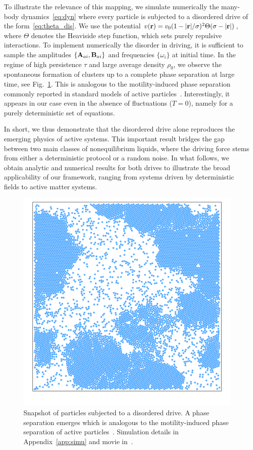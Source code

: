 \documentclass[superscriptaddress, twocolumn, prx, longbibliography, nofootinbib]{revtex4-1}
\begin{document}
To illustrate the relevance of this mapping, we simulate numerically the many-body dynamics~\eqref{eq:dyn} where every particle is subjected to a disordered drive of the form~\eqref{eq:theta_dis}. We use the potential $v({\bf r})=v_0(1-|{\bf r}|/\sigma)^2\Theta(\sigma-|{\bf r}|)$, where $\Theta$ denotes the Heaviside step function, which sets purely repulsive interactions. To implement numerically the disorder in driving, it is sufficient to sample the amplitudes $\{{\bf A}_{ai}, {\bf B}_{ai}\}$ and frequencies $\{\omega_i\}$ at initial time. In the regime of high persistence $\tau$ and large average density $\rho_0$, we observe the spontaneous formation of clusters up to a complete phase separation at large time, see Fig.~\ref{fig0}. This is analogous to the motility-induced phase separation commonly reported in standard models of active particles~\cite{Tailleur2008, Cates2015}. Interestingly, it appears in our case even in the absence of fluctuations ($T=0$), namely for a purely deterministic set of equations.

In short, we thus demonstrate that the disordered drive alone reproduces the emerging physics of active systems. This important result bridges the gap between two main classes of nonequilibrium liquids, where the driving force stems from either a deterministic protocol or a random noise. In what follows, we obtain analytic and numerical results for both drives to illustrate the broad applicability of our framework, ranging from systems driven by deterministic fields to active matter systems. 


\begin{figure}
	\centering
	\includegraphics[width=.8\columnwidth]{fig0.pdf}
	\caption{\label{fig0}
		Snapshot of particles subjected to a disordered drive. A phase separation emerges which is analogous to the motility-induced phase separation of active particles~\cite{Tailleur2008, Cates2015}. Simulation details in Appendix~\ref{app:simu} and movie in~\cite{movie}.
	}
\end{figure}
\end{document}
